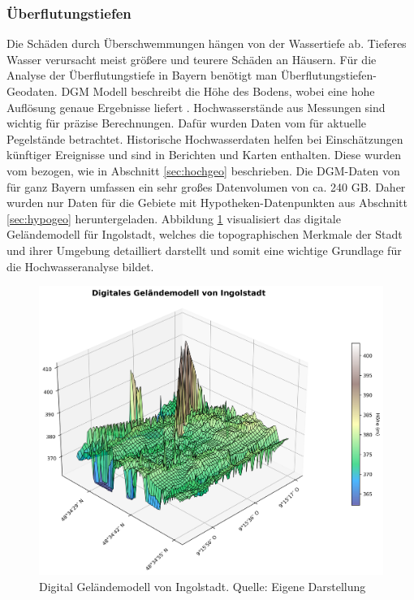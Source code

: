 \subsubsection{Überflutungstiefen}
Die Schäden durch Überschwemmungen hängen von der Wassertiefe ab. Tieferes Wasser verursacht meist größere und teurere Schäden an Häusern. Für die Analyse der Überflutungstiefe in Bayern benötigt man Überflutungstiefen-Geodaten. \ac{DGM} Modell beschreibt die Höhe des Bodens, wobei eine hohe Auflösung genaue Ergebnisse liefert \parencite{vermessungsverwaltung2019gelandemodell}. Hochwasserstände aus Messungen sind wichtig für präzise Berechnungen. Dafür wurden Daten vom \textcite{bayern2016hochwassernachrichtendienst} für aktuelle Pegelstände betrachtet. Historische Hochwasserdaten helfen bei Einschätzungen künftiger Ereignisse und sind in Berichten und Karten enthalten. Diese wurden vom \textcite{LfU_Bayern} bezogen, wie in Abschnitt \ref{sec:hochgeo} beschrieben.
Die \ac{DGM}-Daten von \textcite{vermessungsverwaltung2019gelandemodell} für ganz Bayern umfassen ein sehr großes Datenvolumen von ca. 240 GB. Daher wurden nur Daten für die Gebiete mit Hypotheken-Datenpunkten aus Abschnitt \ref{sec:hypogeo} heruntergeladen. Abbildung \ref{fig:ingolstadt} visualisiert das digitale Geländemodell für Ingolstadt, welches die topographischen Merkmale der Stadt und ihrer Umgebung detailliert darstellt und somit eine wichtige Grundlage für die Hochwasseranalyse bildet.
\begin{figure}[!ht]
    \centering
    \includegraphics[width=\textwidth]{figures/dgm_3d_wireframe_ingolstadt.png}
    \caption{Digital Geländemodell von Ingolstadt. Quelle: Eigene Darstellung}
    \label{fig:ingolstadt}
\end{figure}
\FloatBarrier
